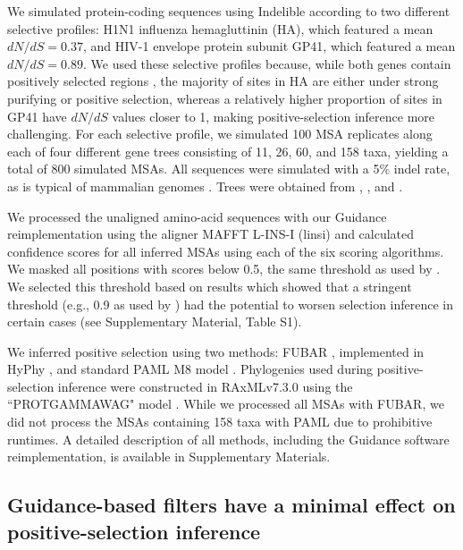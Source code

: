 \documentclass[11pt]{article}
\begin{document}
We simulated protein-coding sequences using Indelible \citep{Fletcher2009} according to two different selective profiles: H1N1 influenza hemagluttinin (HA), which featured a mean $dN/dS = 0.37$, and HIV-1 envelope protein subunit GP41, which featured a mean $dN/dS = 0.89$. We used these selective profiles because, while both genes contain positively selected regions \citep{Bush1999, Frost2001, Bandawe2008, Meyer2012}, the majority of sites in HA are either under strong purifying or positive selection, whereas a relatively higher proportion of sites in GP41 have $dN/dS$ values closer to 1, making positive-selection inference more challenging. For each selective profile, we simulated 100 MSA replicates along each of four different gene trees consisting of 11, 26, 60, and 158 taxa, yielding a total of 800 simulated MSAs. All sequences were simulated with a 5\% indel rate, as is typical of mammalian genomes \citep{Cooper2004}. Trees were obtained from \citet{Spielman2013}, \citet{Yang2011}, and \citet{Betancur2013}.

We processed the unaligned amino-acid sequences with our Guidance reimplementation using the aligner MAFFT L-INS-I (linsi) \citep{Katoh2002,Katoh2005} and calculated confidence scores for all inferred MSAs using each of the six scoring algorithms. We masked all positions with scores below 0.5, the same threshold as used by \citet{Jordan2012}. We selected this threshold based on results which showed that a stringent threshold (e.g., 0.9 as used by \citealt{Privman2012}) had the potential to worsen selection inference in certain cases (see Supplementary Material, Table S1).

We inferred positive selection using two methods: FUBAR \citep{Murrell2013}, implemented in HyPhy \citep{Pond2005}, and standard PAML M8 model \citep{Yang2000, Yang2007}. Phylogenies used during positive-selection inference were constructed in RAxMLv7.3.0 using the ``PROTGAMMAWAG" model \citep{Stamatakis2006}. While we processed all MSAs with FUBAR, we did not process the MSAs containing 158 taxa with PAML due to prohibitive runtimes. A detailed description of all methods, including the Guidance software reimplementation, is available in Supplementary Materials.


\subsection*{Guidance-based filters have a minimal effect on positive-selection inference}
\end{document}
